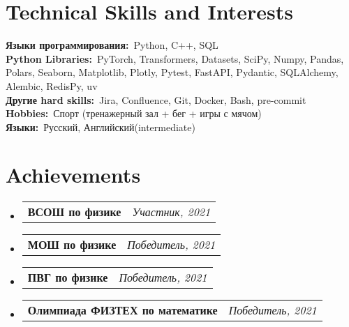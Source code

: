 \documentclass[a4paper,11pt]{article}
\makeatletter
\newcommand{\resumePOR}[3]{
\vspace{0.5mm}\item
    \begin{tabular*}{0.97\textwidth}[t]{l@{\extracolsep{\fill}}r}
        \textbf{#1}\hspace{0.3mm}#2 & \textit{\small{#3}} 
    \end{tabular*}
    \vspace{-2mm}
}
\newcommand{\resumeSubHeadingListStart}{\begin{itemize}[leftmargin=*,labelsep=0mm]}
\newcommand{\resumeSubHeadingListEnd}{\end{itemize}\vspace{2mm}}
\makeatother
\begin{document}
\section{\textbf{Technical Skills and Interests}}
 \begin{itemize}[leftmargin=0.1in, label={}]
    \small{\item{
     \textbf{Языки программирования:}{\ Python, C++, SQL} \\
     \textbf{Python Libraries:}{\ PyTorch, Transformers, Datasets, SciPy, Numpy, Pandas, Polars, Seaborn, Matplotlib, Plotly, Pytest, FastAPI, Pydantic, SQLAlchemy, Alembic, RedisPy, uv} \\
    \textbf{Другие hard skills:}{\ Jira, Confluence, Git, Docker, Bash, pre-commit} \\
     \textbf{Hobbies:}{\ Спорт (тренажерный зал + бег + игры с мячом)} \\
     \textbf{Языки:}{\ Русский, Английский(intermediate)} \\
    }}
 
 \end{itemize}
 \vspace{-16pt}



    




\section{\textbf{Achievements}}
\vspace{-0.4mm}
\resumeSubHeadingListStart
\resumePOR{ВСОШ по физике} %
    {} %
    {Участник, 2021} %
    
\resumePOR{МОШ по физике} %
    {} %
    {Победитель, 2021} %
    
\resumePOR{ПВГ по физике} %
    {} %
    {Победитель, 2021} %
    
\resumePOR{Олимпиада ФИЗТЕХ по математике} %
    {} %
    {Победитель, 2021} %
\resumeSubHeadingListEnd
\vspace{-5mm}



\end{document}

